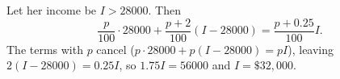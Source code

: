 Let her income be $I>28000$. Then
\[\dfrac{p}{100}\cdot28000+\dfrac{p+2}{100}(I-28000)=\dfrac{p+0.25}{100}I.\]
The terms with $p$ cancel ($p\cdot28000+p(I-28000)=pI$), leaving $2(I-28000)=0.25I$, so $1.75I=56000$ and $I=\boxed{\$32{,}000}$.
